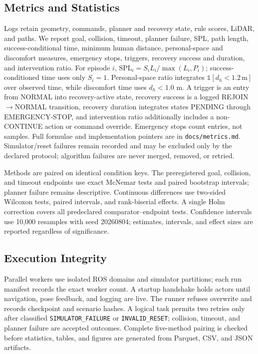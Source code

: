 \subsection{Metrics and Statistics}
Logs retain geometry, commands, planner and recovery state, rule scores, LiDAR,
and paths.  We report goal, collision, timeout, planner failure, SPL, path
length, success-conditional time, minimum human distance, personal-space and
discomfort measures, emergency stops, triggers, recovery success and duration,
and intervention ratio.  For episode $i$,
$\mathrm{SPL}_i=S_iL_i/\max(L_i,P_i)$; success-conditioned time uses only
$S_i=1$.  Personal-space ratio integrates $\mathbb{1}[d_h<1.2\,\mathrm m]$
over observed time, while discomfort time uses $d_h<1.0$ m.  A trigger is an
entry from NORMAL into recovery-active state, recovery success is a logged
REJOIN$\rightarrow$NORMAL transition, recovery duration integrates states
PENDING through EMERGENCY-STOP, and intervention ratio additionally includes a
non-CONTINUE action or command override.  Emergency stops count entries, not
samples.  Full formulae and implementation pointers are in
\texttt{docs/metrics.md}.  Simulator/reset failures remain recorded and may be
excluded only by the declared protocol; algorithm failures are never merged,
removed, or retried.

Methods are paired on identical condition keys.  The preregistered goal,
collision, and timeout endpoints use exact McNemar tests and paired bootstrap
intervals; planner failure remains descriptive.  Continuous differences use
two-sided Wilcoxon tests, paired intervals, and rank-biserial effects.  A single
Holm correction covers all predeclared comparator--endpoint tests.  Confidence
intervals use 10,000 resamples with seed 20260804; estimates, intervals, and
effect sizes are reported regardless of significance.

\subsection{Execution Integrity}
Parallel workers use isolated ROS domains and simulator partitions; each run
manifest records the exact worker count.  A startup
handshake holds actors until navigation, pose feedback, and logging are live.
The runner refuses overwrite and records checkpoint and scenario hashes.  A
logical task permits two retries only after classified
\texttt{SIMULATOR\_FAILURE} or \texttt{INVALID\_RESET}; collision, timeout, and
planner failure are accepted outcomes.  Complete five-method pairing is checked
before statistics, tables, and figures are generated from Parquet, CSV, and
JSON artifacts.
